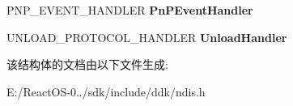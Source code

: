\begin{DoxyCompactItemize}
\item 
\mbox{\label{struct___n_d_i_s40___p_r_o_t_o_c_o_l___c_h_a_r_a_c_t_e_r_i_s_t_i_c_s_a296cff4745cb4fabca7f053db7036f8a}} 
P\+N\+P\+\_\+\+E\+V\+E\+N\+T\+\_\+\+H\+A\+N\+D\+L\+ER {\bfseries Pn\+P\+Event\+Handler}
\item 
\mbox{\label{struct___n_d_i_s40___p_r_o_t_o_c_o_l___c_h_a_r_a_c_t_e_r_i_s_t_i_c_s_afee9efe06311894b28ff681fff212201}} 
U\+N\+L\+O\+A\+D\+\_\+\+P\+R\+O\+T\+O\+C\+O\+L\+\_\+\+H\+A\+N\+D\+L\+ER {\bfseries Unload\+Handler}
\end{DoxyCompactItemize}


该结构体的文档由以下文件生成\+:\begin{DoxyCompactItemize}
\item 
E\+:/\+React\+O\+S-\/0../sdk/include/ddk/ndis.\+h\end{DoxyCompactItemize}
